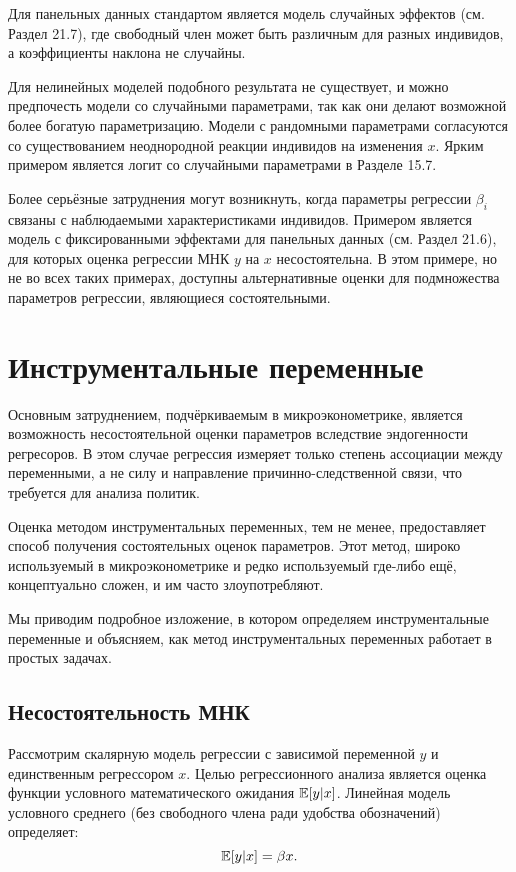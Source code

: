Для панельных данных стандартом является модель случайных эффектов (см. Раздел 21.7), где свободный член может быть различным для разных индивидов, а коэффициенты наклона не случайны.

Для нелинейных моделей подобного результата не существует, и можно предпочесть модели со случайными параметрами, так как они делают возможной более богатую параметризацию. Модели с рандомными параметрами согласуются со существованием неоднородной реакции индивидов на изменения $x$. Ярким примером является логит со случайными параметрами в Разделе 15.7.

Более серьёзные затруднения могут возникнуть, когда параметры регрессии $\beta_i$ связаны с наблюдаемыми характеристиками индивидов. Примером является модель с фиксированными эффектами для панельных данных (см. Раздел 21.6), для которых оценка регрессии МНК $y$ на $x$ несостоятельна. В этом примере, но не во всех таких примерах, доступны альтернативные оценки для подмножества параметров регрессии, являющиеся состоятельными.

\section{Инструментальные переменные}

Основным затруднением, подчёркиваемым в микроэконометрике, является возможность несостоятельной оценки параметров вследствие эндогенности регресоров. В этом случае регрессия измеряет только степень ассоциации между переменными, а не силу и направление причинно-следственной связи, что требуется для анализа политик.

Оценка методом инструментальных переменных, тем не менее, предоставляет способ получения состоятельных оценок параметров. Этот метод, широко используемый в микроэконометрике и редко используемый где-либо ещё, концептуально сложен, и им часто злоупотребляют.

Мы приводим подробное изложение, в котором определяем инструментальные переменные и объясняем, как метод инструментальных переменных работает в простых задачах.

\subsection{Несостоятельность МНК}

Рассмотрим скалярную модель регрессии с зависимой переменной $y$ и единственным регрессором $x$. Целью регрессионного анализа является оценка функции условного математического ожидания $\mathbb{E}[y|x]$. Линейная модель условного среднего (без свободного члена ради удобства обозначений) определяет:
\begin{equation}
\mathbb{E}[y|x] = \beta x.
\end{equation}

